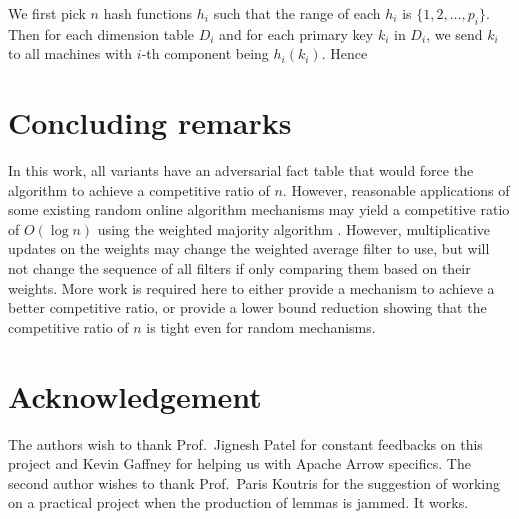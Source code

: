 \documentclass[10pt]{article}
\begin{document}
We first pick $n$ hash functions $h_i$ such that the range of each $h_i$ is $\{1, 2, \dots, p_i\}$. Then for each dimension table $D_i$ and for each primary key $k_i$ in $D_i$, we send $k_i$ to all machines with $i$-th component being $h_i(k_i)$. Hence 



\section{Concluding remarks}





In this work, all variants have an adversarial fact table that would force the algorithm to achieve a competitive ratio of $n$. However, reasonable applications of some existing random online algorithm mechanisms may yield a competitive ratio of $O(\log n)$ using the weighted majority algorithm \cite{littlestone1994weighted}. However, multiplicative updates on the weights may change the weighted average filter to use, but will not change the sequence of all filters if only comparing them based on their weights. More work is required here to either provide a mechanism to achieve a better competitive ratio, or provide a lower bound reduction showing that the competitive ratio of $n$ is tight even for random mechanisms.


\section*{Acknowledgement}
The authors wish to thank Prof.\ Jignesh Patel for constant feedbacks on this project and Kevin Gaffney for helping us with Apache Arrow specifics. The second author wishes to thank Prof.\ Paris Koutris for the suggestion of working on a practical project when the production of lemmas is jammed. It works.


{}

\end{document}
